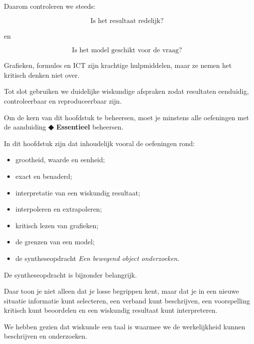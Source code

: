 \documentclass{ximera}
\begin{document}
\begin{oefening}{\oefU \ESS}
\begin{oefening}{\oefB \ESS}
\begin{opmerking}
\begin{opmerking}
\begin{oefening}{\oefU \ESS}
\begin{oefening}{\oefG}
Daarom controleren we steeds:

\[
\boxed{
\text{Is het resultaat redelijk?}
}
\]

en

\[
\boxed{
\text{Is het model geschikt voor de vraag?}
}
\]

Grafieken, formules en ICT zijn krachtige hulpmiddelen, maar ze nemen
het kritisch denken niet over.

Tot slot gebruiken we duidelijke wiskundige afspraken zodat resultaten
eenduidig, controleerbaar en reproduceerbaar zijn.




Om de kern van dit hoofdstuk te beheersen, moet je minstens alle
oefeningen met de aanduiding \textbf{◆ Essentieel} beheersen.

In dit hoofdstuk zijn dat inhoudelijk vooral de oefeningen rond:

\begin{itemize}
  \item grootheid, waarde en eenheid;
  \item exact en benaderd;
  \item interpretatie van een wiskundig resultaat;
  \item interpoleren en extrapoleren;
  \item kritisch lezen van grafieken;
  \item de grenzen van een model;
  \item de syntheseopdracht \emph{Een bewegend object onderzoeken}.
\end{itemize}

De syntheseopdracht is bijzonder belangrijk.

Daar toon je niet alleen dat je losse begrippen kent, maar dat je in
een nieuwe situatie informatie kunt selecteren, een verband kunt
beschrijven, een voorspelling kritisch kunt beoordelen en een
wiskundig resultaat kunt interpreteren.




We hebben gezien dat wiskunde een taal is waarmee we de werkelijkheid
kunnen beschrijven en onderzoeken.


\end{oefening}
\end{oefening}
\end{opmerking}
\end{opmerking}
\end{oefening}
\end{oefening}
\end{document}
